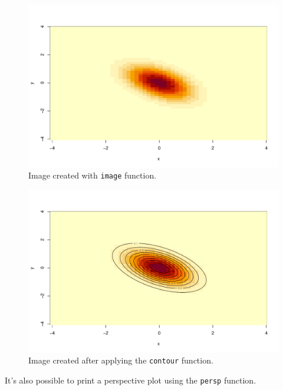\documentclass[a4paper]{article}
\begin{document}
    \newpage

    \begin{figure}[!htp]
        \centering
        \includegraphics[width=\textwidth]{img/3d-plots-func-for-new-libs-1.pdf}
        \caption*{Image created with \texttt{image} function.}
    \end{figure}

    \begin{figure}[!htp]
        \centering
        \includegraphics[width=\textwidth]{img/3d-plots-func-for-new-libs-2.pdf}
        \caption*{Image created after applying the \texttt{contour} function.}
    \end{figure}

    \newpage

    \noindent
    It's also possible to print a perspective plot using the \texttt{persp} function.
    
\end{document}
